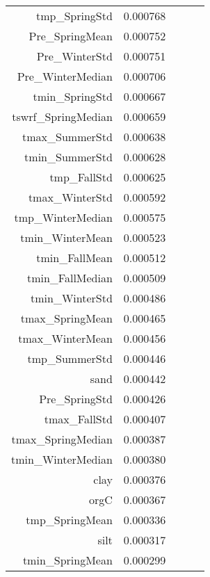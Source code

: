 \begin{tabular}{rrrrr}
tmp_SpringStd & 0.000768 \\
Pre_SpringMean & 0.000752 \\
Pre_WinterStd & 0.000751 \\
Pre_WinterMedian & 0.000706 \\
tmin_SpringStd & 0.000667 \\
tswrf_SpringMedian & 0.000659 \\
tmax_SummerStd & 0.000638 \\
tmin_SummerStd & 0.000628 \\
tmp_FallStd & 0.000625 \\
tmax_WinterStd & 0.000592 \\
tmp_WinterMedian & 0.000575 \\
tmin_WinterMean & 0.000523 \\
tmin_FallMean & 0.000512 \\
tmin_FallMedian & 0.000509 \\
tmin_WinterStd & 0.000486 \\
tmax_SpringMean & 0.000465 \\
tmax_WinterMean & 0.000456 \\
tmp_SummerStd & 0.000446 \\
sand & 0.000442 \\
Pre_SpringStd & 0.000426 \\
tmax_FallStd & 0.000407 \\
tmax_SpringMedian & 0.000387 \\
tmin_WinterMedian & 0.000380 \\
clay & 0.000376 \\
orgC & 0.000367 \\
tmp_SpringMean & 0.000336 \\
silt & 0.000317 \\
tmin_SpringMean & 0.000299 \\
\bottomrule
\end{tabular}
